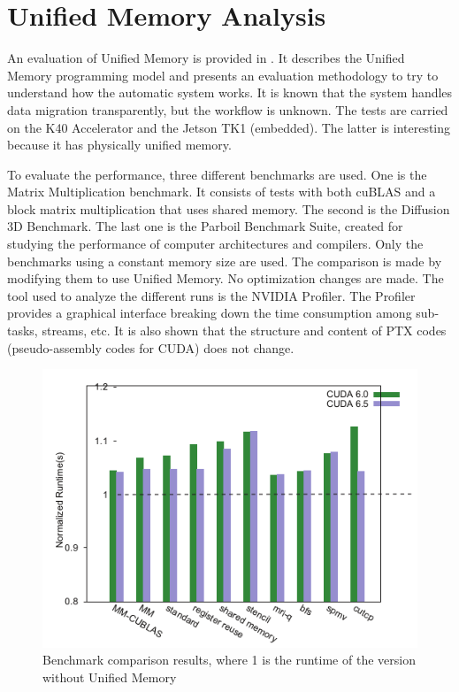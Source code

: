 
\section{Unified Memory Analysis \cite{li2015evaluation}} \label{subsec:unifmemanaly}
An evaluation of Unified Memory is provided in \cite{li2015evaluation}.
It describes the Unified Memory programming model and presents an evaluation methodology to try to understand how the automatic system works.
It is known that the system handles data migration transparently, but the workflow is unknown.
The tests are carried on the K40 Accelerator and the Jetson TK1 (embedded).
The latter is interesting because it has physically unified memory.

To evaluate the performance, three different benchmarks are used.
One is the Matrix Multiplication benchmark.
It consists of tests with both cuBLAS and a block matrix multiplication that uses shared memory.
The second is the Diffusion 3D Benchmark.
The last one is the Parboil Benchmark Suite, created for studying the performance of computer architectures and compilers.
Only the benchmarks using a constant memory size are used.
The comparison is made by modifying them to use Unified Memory.
No optimization changes are made.
The tool used to analyze the different runs is the NVIDIA Profiler.
The Profiler provides a graphical interface breaking down the time consumption among sub-tasks, streams, etc.
It is also shown that the structure and content of PTX codes (pseudo-assembly codes for CUDA) does not change.

\begin{figure}[ht!]
    \centering
    \includegraphics[width=\linewidth]{unified_memory_benchmark_results}
    \caption{Benchmark comparison results, where 1 is the runtime of the version without Unified Memory \cite{li2015evaluation}}
    \label{fig:umem}
\end{figure}

